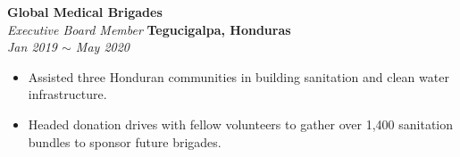 \documentclass[10pt, letterpaper]{article}
\begin{document}
\begin{paracol}{2}
	\textbf{Global Medical Brigades}\\
	\textit{Executive Board Member}
	\switchcolumn
	\raggedleft\textbf{Tegucigalpa, Honduras}\\
	\raggedleft\textit{Jan 2019 $\sim$ May 2020}
\end{paracol}
\vspace{-5mm}
\begin{itemize}
	\item Assisted three Honduran communities in building sanitation and clean water infrastructure.\vspace{-3mm}
	\item Headed donation drives with fellow volunteers to gather over 1,400 sanitation bundles to sponsor future brigades.
\end{itemize}
\vspace{-3mm}

\iffalse
{\large \textbf{\textsc{Personal Projects}}}
\vspace{5pt}
\hrule

\begin{paracol}{2}
	\textbf{\href{https://ugrad.cs.jhu.edu/~czhu26/new_sub/projects/drone.html}{Project Ada}}\\
	\textit{Engineer}
	\switchcolumn
	\raggedleft\textbf{Birmingham, AL}\\
	\raggedleft\textit{May 2020 $\sim$ Aug 2020}
\end{paracol}\vspace{-1mm}
\vspace{-2mm}
\begin{itemize}
	\item Built and deployed a quadcopter drone from scratch.
\end{itemize}
\vspace{-2mm}

\begin{paracol}{2}
	\textbf{\href{https://ugrad.cs.jhu.edu/~czhu26/new_sub/projects/observatory.html}{Night Sky}}\\
	\textit{Telescope Operator}
	\switchcolumn
	\raggedleft\textbf{Baltimore, MD}\\
	\raggedleft\textit{June 2019 $\sim$ Present}
\end{paracol}\vspace{-1mm}
\vspace{-2mm}
\begin{itemize}
	\item Certified operator of the Morris W. Offit telescope at JHU.
	\vspace{-3mm}
	\item Photographed planets in the solar system and stars beyond.
\end{itemize}
\fi
\end{document}
